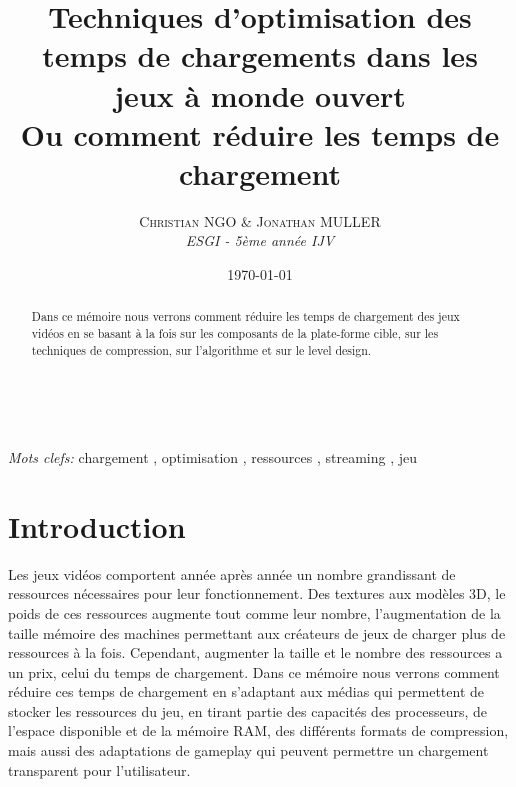 \documentclass[a4paper, 11pt]{article} %
\title{\textbf{Techniques d'optimisation des temps de chargements dans les jeux à monde ouvert}\\ %
Ou comment réduire les temps de chargement} %
\author{\textsc{Christian NGO \& Jonathan MULLER} %
\\{\textit{ESGI - 5ème année IJV}}} %
\date{\today} %
\makeatletter
\renewcommand{\maketitle}{ %
\begin{flushright} %
{\LARGE\@title} %

\vspace{50pt} %

{\large\@author} %
\\\@date %

\vspace{40pt} %
\end{flushright}
}
\makeatother
\begin{document}
\maketitle %



\begin{abstract}
Dans ce mémoire nous verrons comment réduire les temps de chargement des jeux vidéos en se basant à la fois sur les composants de la plate-forme cible, sur les techniques de compression, sur l'algorithme et sur le level design.
\end{abstract}

\hspace*{3,6mm}\textit{Mots clefs:} chargement , optimisation , ressources , streaming , jeu %

\vspace{30pt} %


\section*{Introduction}

Les jeux vidéos comportent année après année un nombre grandissant de ressources nécessaires pour leur fonctionnement. Des textures aux modèles 3D, le poids de ces ressources augmente tout comme leur nombre, l'augmentation de la taille mémoire des machines permettant aux créateurs de jeux de charger plus de ressources à la fois. Cependant, augmenter la taille et le nombre des ressources a un prix, celui du temps de chargement. Dans ce mémoire nous verrons comment réduire ces temps de chargement en s'adaptant aux médias qui permettent de stocker les ressources du jeu, en tirant partie des capacités des processeurs, de l'espace disponible et de la mémoire RAM, des différents formats de compression, mais aussi des adaptations de gameplay qui peuvent permettre un chargement transparent pour l'utilisateur.
\end{document}
